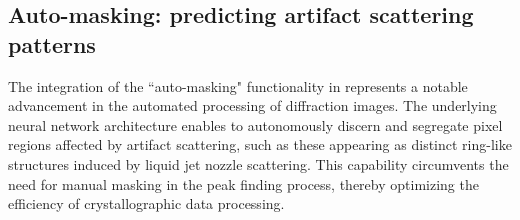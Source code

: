 \documentclass[a4paper]{article}
\begin{document}
\begin{table}
\caption{Merging statistics (TH: thaumatin; PK: proteinase).  TH results were
merged from run 31, 32, 33, 34 and 36, whereas PK results were merged from run
37 and 38.}
\label{tb : merge}
\centering
{}
\end{table}


\subsection{Auto-masking: predicting artifact scattering patterns}

The integration of the ``auto-masking" functionality in \peaknet{} represents a notable advancement in the automated processing of diffraction images.  The underlying neural network architecture enables \peaknet{} to autonomously discern and segregate pixel regions affected by artifact scattering, such as these appearing as distinct ring-like structures induced by liquid jet nozzle scattering.  This capability circumvents the need for manual masking in the peak finding process, thereby optimizing the efficiency of crystallographic data processing.
\end{document}
